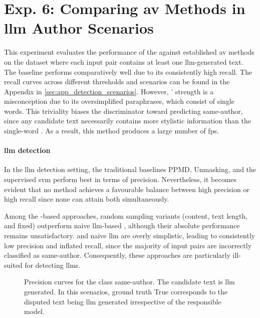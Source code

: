 \section{Exp. 6: Comparing \acs{av} Methods in \acs{llm} Author Scenarios}
\label{sec:results_llm_av}

This experiment evaluates the performance of the \impAppr{} against established \ac{av} methods on the \dataArtificialStudent{} dataset where each input pair contains at least one \ac{llm}-generated text.  
The baseline \mirrorMinds{} performs comparatively well due to its consistently high recall.  
The recall curves across different thresholds and scenarios can be found in the Appendix in \autoref{sec:app_detection_scenarios}.  
However, \mirrorMinds{}' strength is a misconception due to its oversimplified paraphrases, which consist of single words.  
This triviality biases the discriminator toward predicting same-author, since any candidate text necessarily contains more stylistic information than the single-word \imps{}.  
As a result, this method produces a large number of \acp{fp}.


\paragraph{\ac{llm} detection}

In the \ac{llm} detection setting, the traditional baselines PPMD, Unmasking, and the supervised \ac{svm} perform best in terms of precision.  
Nevertheless, it becomes evident that no method achieves a favourable balance between high precision or high recall since none can attain both simultaneously.  

Among the \imp{}-based approaches, random sampling variants (content, text length, and fixed) outperform naive \ac{llm}-based \imps{}, although their absolute performance remains unsatisfactory.  
\mirrorMinds{} and naive \ac{llm} \imps{} are overly simplistic, leading to consistently low precision and inflated recall, since the majority of input pairs are incorrectly classified as same-author.  
Consequently, these approaches are particularly ill-suited for detecting \acp{llm}.

\begin{figure}[h]
  
\caption{Precision curves for the class same-author. 
The candidate text is \ac{llm} generated.
In this scenarios, ground truth True corresponds to the disputed text being \ac{llm} generated irrespective of the responsible model.
}
\label{fig:llm_detection_prec}
\end{figure}

